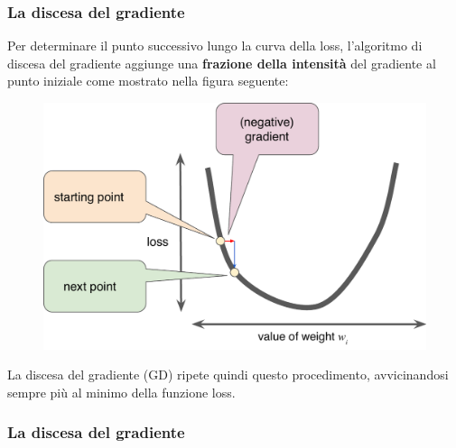 \begin{frame}

	\frametitle{La discesa del gradiente}

		Per determinare il punto successivo lungo la curva della loss, l'algoritmo di discesa del gradiente aggiunge una \textbf{frazione della intensità} del gradiente al punto iniziale come mostrato nella figura seguente:

		\begin{figure}[!htbp]
			\centering
			\includegraphics[width=0.5\linewidth]{images/supervised/training_reducing_loss/GradientDescentGradientStep.pdf}
		\end{figure}

		La discesa del gradiente (GD) ripete quindi questo procedimento, avvicinandosi sempre più al minimo della funzione loss.

\end{frame}


\begin{frame}

	\frametitle{La discesa del gradiente}

		\centering

\end{frame}


